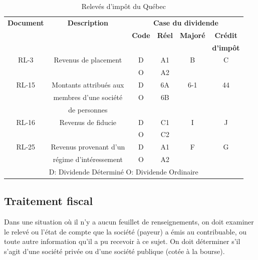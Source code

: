 \begin{table}
	\centering
	\begin{tabular}{|c|c|c|c|c|c|}
		\hline
		\textbf{Document} &  \textbf{Description}  &          \multicolumn{4}{c|}{\textbf{Case du dividende}}           \\ \cline{3-6}
		                  &                        & \textbf{Code} & \textbf{Réel} & \textbf{Majoré} & \textbf{Crédit}  \\
		                  &                        &               &               &                 & \textbf{d'impôt} \\ \hline
		      RL-3        &  Revenus de placement  &       D       &      A1       &        B        &        C         \\ \cline{3-4}
		                  &                        &       O       &      A2       &                 &                  \\ \hline
		      RL-15       & Montants attribués aux &       D       &      6A       &       6-1       &        44        \\ \cline{3-4}
		                  & membres d'une société  &       O       &      6B       &                 &                  \\
		                  &      de personnes      &               &               &                 &                  \\ \hline
		      RL-16       &   Revenus de fiducie   &       D       &      C1       &        I        &        J         \\ \cline{3-4}
		                  &                        &       O       &      C2       &                 &                  \\ \hline
		      RL-25       & Revenus provenant d'un &       D       &      A1       &        F        &        G         \\ \cline{3-4}
		                  & régime d'intéressement &       O       &      A2       &                 &                  \\ \hline\hline
		\multicolumn{6}{|c|}{D: Dividende Déterminé \qquad O: Dividende Ordinaire}                                      \\ \hline
	\end{tabular}
	\caption{Relevés d'impôt du Québec}
	\label{table:Releves}
\end{table}


\subsection{Traitement fiscal}
Dans une situation où il n'y a aucun feuillet de renseignements, on doit examiner le relevé ou l'état de compte que la société (payeur) a émis au contribuable, ou toute autre information qu'il a pu recevoir à ce sujet. On doit déterminer s'il s'agit d'une société privée ou d'une société publique (cotée à la bourse). 

